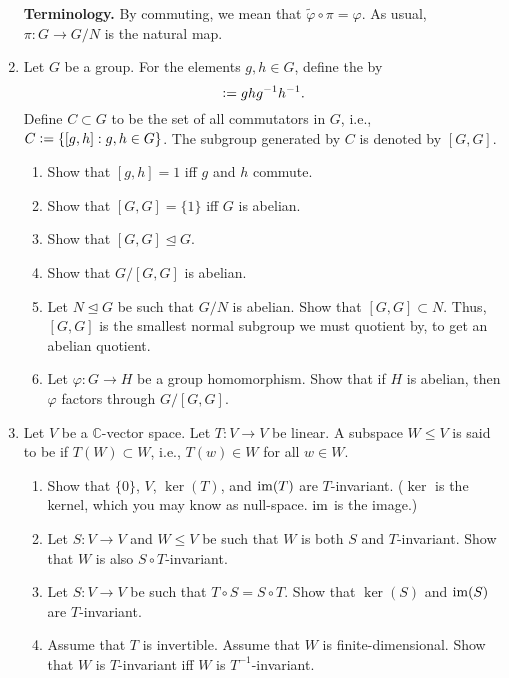 \documentclass[12pt]{article}
\begin{document}
\begin{enumerate}
	\textbf{Terminology.} By  commuting, we mean that $\widetilde{\varphi} \circ \pi = \varphi$. As usual, $\pi : G \to G/N$ is the natural map.
	\item Let $G$ be a group. For the elements $g, h \in G$, define the  by
	\begin{equation*} 
		[g, h] \vcentcolon= ghg^{-1}h^{-1}.
	\end{equation*} 
	Define $C \subset G$ to be the set of all commutators in $G$, i.e., $C \vcentcolon= \{[g, h] : g, h \in G\}$. The subgroup generated by $C$ is denoted by $[G, G]$. 
	\begin{enumerate}
		\item Show that $[g, h] = 1$ iff $g$ and $h$ commute. 
		\item Show that $[G, G] = \{1\}$ iff $G$ is abelian.
		\item Show that $[G, G] \unlhd G$.
		\item Show that $G/[G, G]$ is abelian.
		\item Let $N \unlhd G$ be such that $G/N$ is abelian. Show that $[G, G] \subset N$. Thus, $[G, G]$ is the smallest normal subgroup we must quotient by, to get an abelian quotient.
		\item Let $\varphi : G \to H$ be a group homomorphism. Show that if $H$ is abelian, then $\varphi$ factors through $G/[G, G]$.
	\end{enumerate}
	\item Let $V$ be a $\mathbb{C}$-vector space. Let $T : V \to V$ be linear. A subspace $W \le V$ is said to be  if $T(W) \subset W$, i.e., $T(w) \in W$ for all $w \in W$.
	\begin{enumerate}
		\item Show that $\{0\}$, $V$, $\ker(T)$, and $\operatorname{im}(T)$ are $T$-invariant. ($\ker$ is the kernel, which you may know as null-space. $\operatorname{im}$ is the image.)
		\item Let $S : V \to V$ and $W \le V$ be such that $W$ is both $S$ and $T$-invariant. Show that $W$ is also $S \circ T$-invariant.
		\item Let $S : V \to V$ be such that $T \circ S = S \circ T$. Show that $\ker(S)$ and $\operatorname{im}(S)$ are $T$-invariant. %
		\item Assume that $T$ is invertible. Assume that $W$ is finite-dimensional. Show that $W$ is $T$-invariant iff $W$ is $T^{-1}$-invariant. \\

\end{enumerate}
\end{enumerate}
\end{document}
